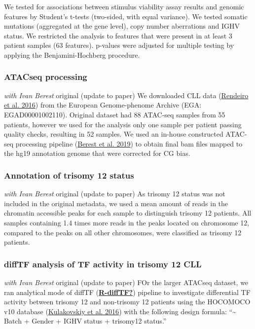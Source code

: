 \documentclass[11pt, a4paper, twosided]{book}
\begin{document}
We tested for associations between stimulus viability assay results and genomic features by Student's t-tests (two-sided, with equal variance). We tested somatic mutations (aggregated at the gene level), copy number aberrations and IGHV status. We restricted the analysis to features that were present in at least 3 patient samples (63 features). p-values were adjusted for multiple testing by applying the Benjamini-Hochberg procedure.

\hypertarget{atacseq-processing}{%
\subsubsection{ATACseq processing}\label{atacseq-processing}}

\emph{with Ivan Berest} original (update to paper)
We downloaded CLL data (\protect\hyperlink{ref-Rendeiro2016}{Rendeiro et al. 2016}) from the European Genome-phenome Archive (EGA: EGAD00001002110). Original dataset had 88 ATAC-seq samples from 55 patients, however we used for the analysis only one sample per patient passing quality checks, resulting in 52 samples. We used an in-house constructed ATAC-seq processing pipeline (\protect\hyperlink{ref-Berest2019}{Berest et al. 2019}) to obtain final bam files mapped to the hg19 annotation genome that were corrected for CG bias.

\hypertarget{annotation-of-trisomy-12-status}{%
\subsubsection{Annotation of trisomy 12 status}\label{annotation-of-trisomy-12-status}}

\emph{with Ivan Berest} original (update to paper)
As trisomy 12 status was not included in the original metadata, we used a mean amount of reads in the chromatin accessible peaks for each sample to distinguish trisomy 12 patients. All samples containing 1.4 times more reads in the peaks located on chromosome 12, compared to the peaks on all other chromosomes, were classified as trisomy 12 patients.

\hypertarget{difftf-analysis-of-tf-activity-in-trisomy-12-cll}{%
\subsubsection{diffTF analysis of TF activity in trisomy 12 CLL}\label{difftf-analysis-of-tf-activity-in-trisomy-12-cll}}

\emph{with Ivan Berest} original (update to paper)
FOr the larger ATACseq dataset, we ran analytical mode of diffTF (\protect\hyperlink{ref-R-diffTF}{\textbf{R-diffTF?}}) pipeline to investigate differential TF activity between trisomy 12 and non-trisomy 12 patients using the HOCOMOCO v10 database (\protect\hyperlink{ref-HOCOMOCO}{Kulakovskiy et al. 2016}) with the following design formula: ``\textasciitilde{} Batch + Gender + IGHV status + trisomy12 status.''
\end{document}
